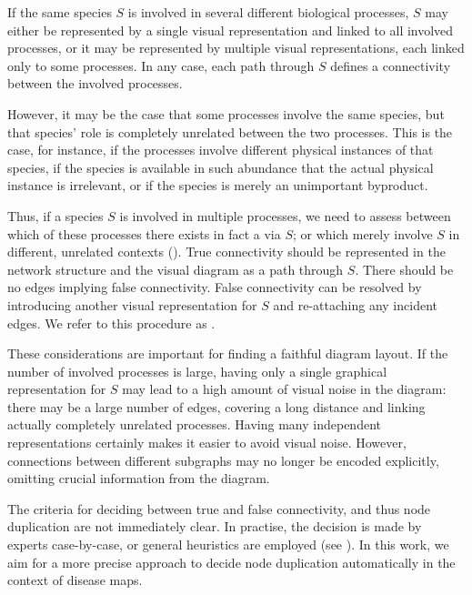 \documentclass[
	fontsize=10pt, %
	twoside=true, %
	secnumdepth=1, %
  toc=indentunnumbered %
]{kaobook}
\begin{document}
If the same species $S$ is involved in several different biological processes,
$S$ may either be represented by a single visual representation and linked to
all involved processes, or it may be represented by multiple visual
representations, each linked only to some processes.
%
In any case, each path through $S$ defines a connectivity
between the involved processes.

However, it may be the case that some processes involve the same
species, but that species' role is completely unrelated between the two
processes. This is the case, for instance, if the processes involve different
physical instances of that species, if the species is available in such
abundance that the actual physical instance is irrelevant, or if the species is
merely an unimportant byproduct.

Thus, if a species $S$ is involved in multiple processes, we need to assess
between which of these processes there exists in fact a 
via $S$; or which merely involve $S$ in different, unrelated contexts
().
%
True connectivity should be represented in the network structure and the visual
diagram as a path through $S$. There should be no edges implying false
connectivity.
False connectivity can be resolved by introducing another visual representation
for $S$ and re-attaching any incident edges. We refer to this procedure as
.

These considerations are important for finding a faithful diagram layout.
If the number of involved processes is large, having only a single graphical
representation for $S$ may lead to a high amount of visual noise in the diagram: there
may be a large number of edges, covering a long distance and linking actually
completely unrelated processes.
%
Having many independent representations
certainly makes it easier to avoid visual noise. However, connections between
different subgraphs may no longer be encoded explicitly, omitting crucial
information from the diagram.

The criteria for deciding between true and false connectivity, and thus node
duplication are not immediately clear. In practise, the decision is made by
experts case-by-case, or general heuristics are employed (see
). In this work, we aim for a more precise approach to
decide node duplication automatically in the context of disease maps.
\end{document}
